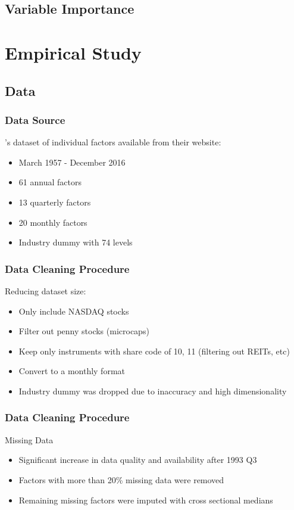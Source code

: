 \documentclass[aspectratio=169]{beamer}
\begin{document}


\subsection{Variable Importance}

\section{Empirical Study}

\subsection{Data}

\begin{frame}
\frametitle{Data Source}
\cite{gu_empirical_2018}'s dataset of individual factors available from their website:
\begin{itemize}
	\item March 1957 - December 2016
	\item 61 annual factors
	\item 13 quarterly factors
	\item 20 monthly factors
	\item Industry dummy with 74 levels
\end{itemize}
\end{frame}

\begin{frame}
\frametitle{Data Cleaning Procedure}
Reducing dataset size:
\begin{itemize}
	\item Only include NASDAQ stocks
	\item Filter out penny stocks (microcaps)
	\item Keep only instruments with share code of 10, 11 (filtering out REITs, etc)
	\item Convert to a monthly format
	\item Industry dummy was dropped due to inaccuracy and high dimensionality
\end{itemize}
\end{frame}

\begin{frame}
\frametitle{Data Cleaning Procedure}
Missing Data
\begin{itemize}
	\item Significant increase in data quality and availability after 1993 Q3
	\item Factors with more than 20\% missing data were removed
	\item Remaining missing factors were imputed with cross sectional medians
\end{itemize}
\end{frame}
\end{document}
